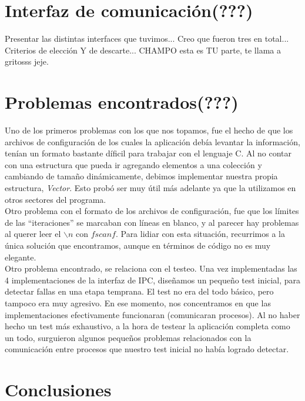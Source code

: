 \documentclass[a4paper,10pt]{article}
\begin{document}
\newpage
\section{Interfaz de comunicación(???)}
Presentar las distintas interfaces que tuvimos...
Creo que fueron tres en total... 
Criterios de elección Y de descarte...
CHAMPO esta es TU parte, te llama a gritosss jeje.

\newpage
\section{Problemas encontrados(???)}

Uno de los primeros problemas con los que nos topamos, fue el hecho de que los archivos de configuración de los cuales la aplicación debía levantar la información, tenían un formato
bastante díficil para trabajar con el lenguaje C. Al no contar con una estructura que pueda ir agregando elementos a una colección y cambiando de tamaño dinámicamente, debimos 
implementar nuestra propia estructura, \textit{Vector}. Esto probó ser muy útil más adelante ya que la utilizamos en otros sectores del programa.\\

Otro problema con el formato de los archivos de configuración, fue que los límites de las ``iteraciones'' se marcaban con líneas en blanco, y al parecer hay problemas al querer leer el 
$\backslash n$ con $fscanf$. Para lidiar con esta situación, recurrimos a la única solución que encontramos, aunque en términos de código no es muy elegante.\\

Otro problema encontrado, se relaciona con el testeo. Una vez implementadas las 4 implementaciones de la interfaz de IPC, diseñamos un pequeño test inicial, para detectar fallas en una 
etapa temprana. El test no era del todo básico, pero tampoco era muy agresivo. En ese momento, nos concentramos en que las implementaciones efectivamente funcionaran (comunicaran
 procesos). Al no haber hecho un test más exhaustivo, a la hora de testear la aplicación completa como un todo, surguieron algunos pequeños problemas relacionados con la 
 comunicación entre procesos que nuestro test inicial no había logrado detectar.\\

\newpage
\section{Conclusiones}
\end{document}
